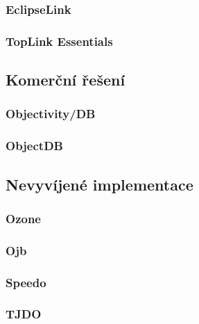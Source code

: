 \subsubsection{EclipseLink}
\subsubsection{TopLink Essentials}
\subsection{Komerční řešení}
\subsubsection{Objectivity/DB}
\subsubsection{ObjectDB}
\subsection{Nevyvíjené implementace}
\subsubsection{Ozone}
\subsubsection{Ojb}
\subsubsection{Speedo}
\subsubsection{TJDO}
